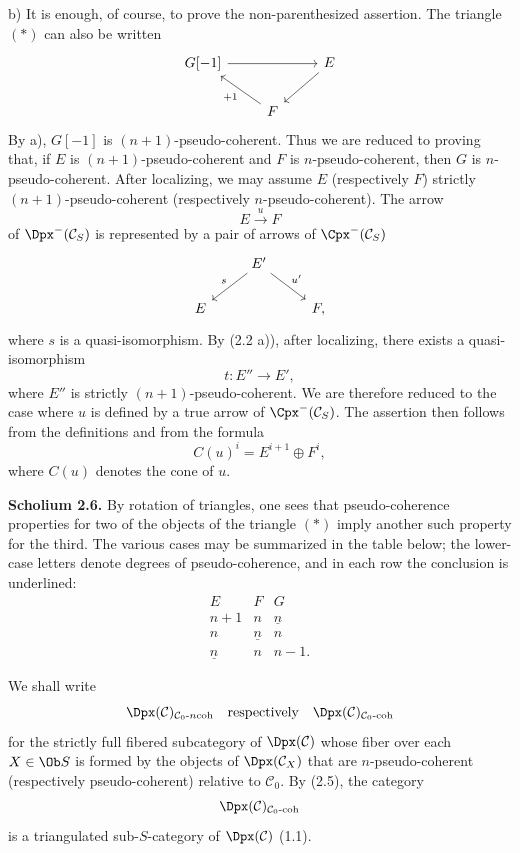 b) It is enough, of course, to prove the non-parenthesized assertion. The triangle \((*)\) can also be written
\[
\begin{tikzcd}
G[-1] \arrow[rr] && E \arrow[dl]\\
& F \arrow[ul,"+1"] &
\end{tikzcd}
\]
By a), \(G[-1]\) is \((n+1)\)-pseudo-coherent. Thus we are reduced to proving that, if \(E\) is \((n+1)\)-pseudo-coherent and \(F\) is \(n\)-pseudo-coherent, then \(G\) is \(n\)-pseudo-coherent. After localizing, we may assume \(E\) (respectively \(F\)) strictly \((n+1)\)-pseudo-coherent (respectively \(n\)-pseudo-coherent). The arrow
\[
  E\xrightarrow{u}F
\]
of \(\Dpx^-(\mathcal C_S)\) is represented by a pair of arrows of \(\Cpx^-(\mathcal C_S)\)
\[
\begin{tikzcd}
& E' \arrow[dl,"s"'] \arrow[dr,"u'"]\\
E && F ,
\end{tikzcd}
\]
where \(s\) is a quasi-isomorphism. By (2.2 a)), after localizing, there exists a quasi-isomorphism
\[
  t:E''\longrightarrow E',
\]
where \(E''\) is strictly \((n+1)\)-pseudo-coherent. We are therefore reduced to the case where \(u\) is defined by a true arrow of \(\Cpx^-(\mathcal C_S)\). The assertion then follows from the definitions and from the formula
\[
  C(u)^i=E^{i+1}\oplus F^i,
\]
where \(C(u)\) denotes the cone of \(u\).

\textbf{Scholium 2.6.} By rotation of triangles, one sees that pseudo-coherence properties for two of the objects of the triangle \((*)\) imply another such property for the third. The various cases may be summarized in the table below; the lower-case letters denote degrees of pseudo-coherence, and in each row the conclusion is underlined:
\[
\begin{array}{ccc}
E&F&G\\[0.2em]
n+1&n&\underline n\\
n&\underline n&n\\
\underline n&n&n-1 .
\end{array}
\]

We shall write
\[
  \Dpx(\mathcal C)_{\mathcal C_0\text{-}n\mathrm{coh}}
  \quad\text{respectively}\quad
  \Dpx(\mathcal C)_{\mathcal C_0\text{-}\mathrm{coh}}
\]
for the strictly full fibered subcategory of \(\Dpx(\mathcal C)\) whose fiber over each \(X\in\Ob S\) is formed by the objects of \(\Dpx(\mathcal C_X)\) that are \(n\)-pseudo-coherent (respectively pseudo-coherent) relative to \(\mathcal C_0\). By (2.5), the category
\[
  \Dpx(\mathcal C)_{\mathcal C_0\text{-}\mathrm{coh}}
\]
is a triangulated sub-\(S\)-category of \(\Dpx(\mathcal C)\) (1.1).


